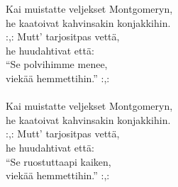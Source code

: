 
            Kai muistatte veljekset Montgomeryn, \\
            he kaatoivat kahvinsakin konjakkihin. \\
            :,: Mutt’ tarjositpas vettä, \\
            he huudahtivat että: \\
            “Se polvihimme menee, \\
            viekää hemmettihin.” :,: \\
\hspace{10mm} \\
            Kai muistatte veljekset Montgomeryn, \\
            he kaatoivat kahvinsakin konjakkihin. \\
            :,: Mutt’ tarjositpas vettä, \\
            he huudahtivat että: \\
            “Se ruostuttaapi kaiken, \\
            viekää hemmettihin.” :,: \\
